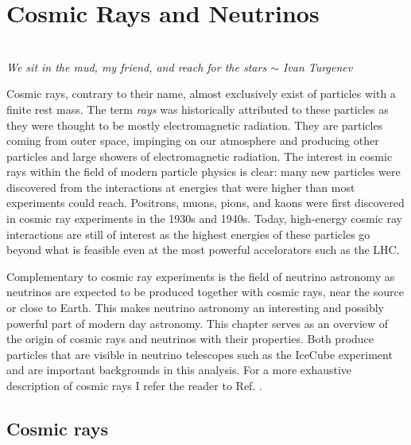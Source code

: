 \chapter{Cosmic Rays and Neutrinos}
\label{ch:cr}
\begin{flushright}
\textit{\\We sit in the mud, my friend, and reach for the stars $\sim$ Ivan Turgenev\\}\end{flushright}


\noindent Cosmic rays, contrary to their name, almost exclusively exist of particles with a finite rest mass. The term \textit{rays} was historically attributed to these particles as they were thought to be mostly electromagnetic radiation. They are particles coming from outer space, impinging on our atmosphere and producing other particles and large showers of electromagnetic radiation.
The interest in cosmic rays within the field of modern particle physics is clear: many new particles were discovered from the interactions at energies that were higher than most experiments could reach. Positrons, muons, pions, and kaons were first discovered in cosmic ray experiments in the 1930s and 1940s. Today, high-energy cosmic ray interactions are still of interest as the highest energies of these particles go beyond what is feasible even at the most powerful accelorators such as the LHC.

Complementary to cosmic ray experiments is the field of neutrino astronomy as neutrinos are expected to be produced together with cosmic rays, near the source or close to Earth. This makes neutrino astronomy an interesting and possibly powerful part of modern day astronomy. This chapter serves as an overview of the origin of cosmic rays and neutrinos with their properties. Both produce particles that are visible in neutrino telescopes such as the IceCube experiment and are important backgrounds in this analysis. For a more exhaustive description of cosmic rays I refer the reader to Ref. \cite{Gaisser:2016uoy}.

\section{Cosmic rays}
